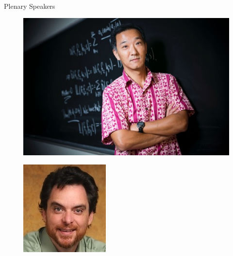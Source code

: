 \documentclass[final,hyperref={pdfpagelabels=false},12pt]{beamer}
\begin{document}
\begin{frame}[t]
\begin{columns}[t]
\begin{column}{.465\textwidth}
\begin{block}{Plenary Speakers}
\begin{figure}[ht]
        \begin{minipage}[b]{0.45\linewidth}
            \centering
            \includegraphics[width=\textwidth]{ken}
            \label{fig:a}
        \end{minipage}
        \hspace{0.5cm}
        \begin{minipage}[b]{0.45\linewidth}
            \centering
            \includegraphics[scale=.35,width=\textwidth]{tim}
            \label{fig:b}
        \end{minipage}
    \end{figure}


\end{block}
\end{column}
\end{columns}
\end{frame}
\end{document}
